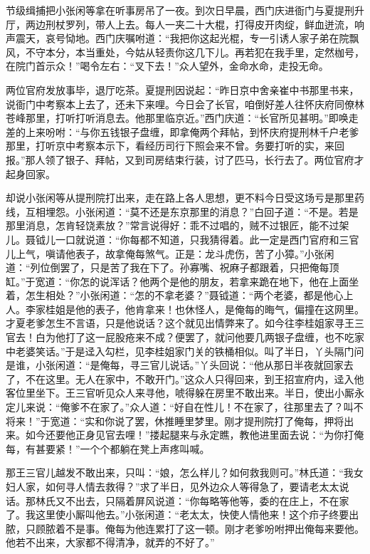 节级缉捕把小张闲等拿在听事房吊了一夜。到次日早晨，西门庆进衙门与夏提刑升厅，两边刑杖罗列，带人上去。每人一夹二十大棍，打得皮开肉绽，鲜血迸流，响声震天，哀号恸地。西门庆嘱咐道：“我把你这起光棍，专一引诱人家子弟在院飘风，不守本分，本当重处，今姑从轻责你这几下儿。再若犯在我手里，定然枷号，在院门首示众！”喝令左右：“叉下去！”众人望外，金命水命，走投无命。

两位官府发放事毕，退厅吃茶。夏提刑因说起：“昨日京中舍亲崔中书那里书来，说衙门中考察本上去了，还未下来哩。今日会了长官，咱倒好差人往怀庆府同僚林苍峰那里，打听打听消息去。他那里临京近。”西门庆道：“长官所见甚明。”即唤走差的上来吩咐：“与你五钱银子盘缠，即拿俺两个拜帖，到怀庆府提刑林千户老爹那里，打听京中考察本示下，看经历司行下照会来不曾。务要打听的实，来回报。”那人领了银子、拜帖，又到司房结束行装，讨了匹马，长行去了。两位官府才起身回家。

却说小张闲等从提刑院打出来，走在路上各人思想，更不料今日受这场亏是那里药线，互相埋怨。小张闲道：“莫不还是东京那里的消息？”白回子道：“不是。若是那里消息，怎肯轻饶素放？”常言说得好：乖不过唱的，贼不过银匠，能不过架儿。聂钺儿一口就说道：“你每都不知道，只我猜得着。此一定是西门官府和三官儿上气，嗔请他表子，故拿俺每煞气。正是：龙斗虎伤，苦了小獐。”小张闲道：“列位倒罢了，只是苦了我在下了。孙寡嘴、祝麻子都跟着，只把俺每顶缸。”于宽道：“你怎的说浑话？他两个是他的朋友，若拿来跪在地下，他在上面坐着，怎生相处？”小张闲道：“怎的不拿老婆？”聂钺道：“两个老婆，都是他心上人。李家桂姐是他的表子，他肯拿来！也休怪人，是俺每的晦气，偏撞在这网里。才夏老爹怎生不言语，只是他说话？这个就见出情弊来了。如今往李桂姐家寻王三官去！白为他打了这一屁股疮来不成？便罢了，就问他要几两银子盘缠，也不吃家中老婆笑话。”于是迳入勾栏，见李桂姐家门关的铁桶相似。叫了半日，丫头隔门问是谁，小张闲道：“是俺每，寻三官儿说话。”丫头回说：“他从那日半夜就回家去了，不在这里。无人在家中，不敢开门。”这众人只得回来，到王招宣府内，迳入他客位里坐下。王三官听见众人来寻他，唬得躲在房里不敢出来。半日，使出小厮永定儿来说：“俺爹不在家了。”众人道：“好自在性儿！不在家了，往那里去了？叫不将来！”于宽道：“实和你说了罢，休推睡里梦里。刚才提刑院打了俺每，押将出来。如今还要他正身见官去哩！”搂起腿来与永定瞧，教他进里面去说：“为你打俺每，有甚要紧！”一个个都躺在凳上声疼叫喊。

那王三官儿越发不敢出来，只叫：“娘，怎么样儿？如何救我则可。”林氏道：“我女妇人家，如何寻人情去救得？”求了半日，见外边众人等得急了，要请老太太说话。那林氏又不出去，只隔着屏风说道：“你每略等他等，委的在庄上，不在家了。我这里使小厮叫他去。”小张闲道：“老太太，快使人情他来！这个疖子终要出脓，只顾脓着不是事。俺每为他连累打了这一顿。刚才老爹吩咐押出俺每来要他。他若不出来，大家都不得清净，就弄的不好了。”

